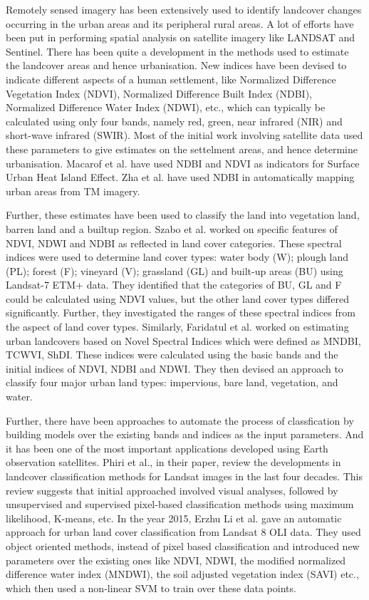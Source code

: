 Remotely sensed imagery has been extensively used to identify landcover changes occurring in the urban areas and its peripheral rural areas. A lot of efforts have been put in performing spatial analysis on satellite imagery like LANDSAT and Sentinel. There has been quite a development in the methods used to estimate the landcover areas and hence urbanisation. New indices have been devised to indicate different aspects of a human settlement, like Normalized Difference Vegetation Index (NDVI), Normalized Difference Built Index (NDBI), Normalized Difference Water Index (NDWI), etc., which can typically be calculated using only four bands, namely red, green, near infrared (NIR) and short-wave infrared (SWIR). Most of the initial work involving satellite data used these parameters to give estimates on the settelment areas, and hence determine urbanisation. Macarof et al.\cite{ndvindbiheatisland} have used NDBI and NDVI as indicators for Surface Urban Heat Island Effect. Zha et al.\cite{ndbiurbanisation} have used NDBI in automatically mapping urban areas from TM imagery. 

Further, these estimates have been used to classify the land into vegetation land, barren land and a builtup region. Szabo et al.\cite{ndvi1} worked on specific features of NDVI, NDWI and NDBI as reflected in land cover categories. These spectral indices were used to determine land cover types: water body (W); plough land (PL); forest (F); vineyard (V); grassland (GL) and built-up areas (BU) using Landsat-7 ETM+ data. They identified that the categories of BU, GL and F could be calculated using NDVI values, but the other land cover types differed significantly. Further, they investigated the ranges of these spectral indices from the aspect of land cover types. Similarly, Faridatul et al.\cite{novelspectralindices} worked on estimating urban landcovers based on Novel Spectral Indices which were defined as MNDBI, TCWVI, ShDI. These indices were calculated using the basic bands and the initial indices of NDVI, NDBI and NDWI. They then devised an approach to classify four major urban land types: impervious, bare land, vegetation, and water. 

Further, there have been approaches to automate the process of classfication by building models over the existing bands and indices as the input parameters. And it has been one of the most important applications developed using Earth observation satellites. Phiri et al.\cite{classificationreview}, in their paper, review the developments in landcover classification methods for Landsat images in the last four decades. This review suggests that initial approached involved visual analyses, followed by unsupervised and supervised pixel-based classification methods using maximum likelihood, K-means, etc. In the year 2015, Erzhu Li et al.\cite{ndvi2} gave an automatic approach for urban land cover classification from Landsat 8 OLI data. They used object oriented methods, instead of pixel based classification and introduced new parameters over the existing ones like NDVI, NDWI, the modified normalized difference water index (MNDWI), the soil adjusted vegetation index (SAVI) etc., which then used a non-linear SVM to train over these data points.

